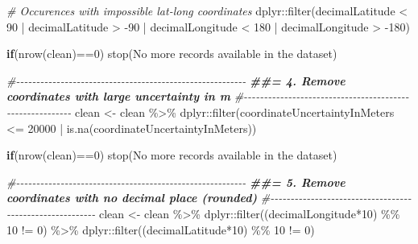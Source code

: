 \documentclass[
]{article}
\newenvironment{Shaded}{\begin{snugshade}}{\end{snugshade}}
\newcommand{\CommentTok}[1]{\textcolor[rgb]{0.56,0.35,0.01}{\textit{#1}}}
\newcommand{\ControlFlowTok}[1]{\textcolor[rgb]{0.13,0.29,0.53}{\textbf{#1}}}
\newcommand{\DecValTok}[1]{\textcolor[rgb]{0.00,0.00,0.81}{#1}}
\newcommand{\DocumentationTok}[1]{\textcolor[rgb]{0.56,0.35,0.01}{\textbf{\textit{#1}}}}
\newcommand{\FunctionTok}[1]{\textcolor[rgb]{0.00,0.00,0.00}{#1}}
\newcommand{\NormalTok}[1]{#1}
\newcommand{\OtherTok}[1]{\textcolor[rgb]{0.56,0.35,0.01}{#1}}
\newcommand{\SpecialCharTok}[1]{\textcolor[rgb]{0.00,0.00,0.00}{#1}}
\newcommand{\StringTok}[1]{\textcolor[rgb]{0.31,0.60,0.02}{#1}}
\begin{document}
\begin{Shaded}
\begin{Highlighting}[]
  \CommentTok{\# Occurences with impossible lat{-}long coordinates}
\NormalTok{  dplyr}\SpecialCharTok{::}\FunctionTok{filter}\NormalTok{(decimalLatitude }\SpecialCharTok{\textless{}} \DecValTok{90} \SpecialCharTok{|}\NormalTok{ decimalLatitude }\SpecialCharTok{\textgreater{}} \SpecialCharTok{{-}}\DecValTok{90} \SpecialCharTok{|}
\NormalTok{                  decimalLongitude }\SpecialCharTok{\textless{}} \DecValTok{180} \SpecialCharTok{|}\NormalTok{ decimalLongitude }\SpecialCharTok{\textgreater{}} \SpecialCharTok{{-}}\DecValTok{180}\NormalTok{)}

\ControlFlowTok{if}\NormalTok{(}\FunctionTok{nrow}\NormalTok{(clean)}\SpecialCharTok{==}\DecValTok{0}\NormalTok{) }\FunctionTok{stop}\NormalTok{(}\StringTok{\textquotesingle{}No more records available in the dataset\textquotesingle{}}\NormalTok{)}

\CommentTok{\#{-}{-}{-}{-}{-}{-}{-}{-}{-}{-}{-}{-}{-}{-}{-}{-}{-}{-}{-}{-}{-}{-}{-}{-}{-}{-}{-}{-}{-}{-}{-}{-}{-}{-}{-}{-}{-}{-}{-}{-}{-}{-}{-}{-}{-}{-}{-}{-}{-}{-}{-}{-}{-}{-}{-}{-}{-}}
\DocumentationTok{\#\#= 4. Remove coordinates with large uncertainty in m}
\CommentTok{\#{-}{-}{-}{-}{-}{-}{-}{-}{-}{-}{-}{-}{-}{-}{-}{-}{-}{-}{-}{-}{-}{-}{-}{-}{-}{-}{-}{-}{-}{-}{-}{-}{-}{-}{-}{-}{-}{-}{-}{-}{-}{-}{-}{-}{-}{-}{-}{-}{-}{-}{-}{-}{-}{-}{-}{-}{-}}
\NormalTok{clean }\OtherTok{\textless{}{-}}\NormalTok{ clean }\SpecialCharTok{\%\textgreater{}\%}
\NormalTok{  dplyr}\SpecialCharTok{::}\FunctionTok{filter}\NormalTok{(coordinateUncertaintyInMeters }\SpecialCharTok{\textless{}=} \DecValTok{20000} \SpecialCharTok{|}
                  \FunctionTok{is.na}\NormalTok{(coordinateUncertaintyInMeters))}

\ControlFlowTok{if}\NormalTok{(}\FunctionTok{nrow}\NormalTok{(clean)}\SpecialCharTok{==}\DecValTok{0}\NormalTok{) }\FunctionTok{stop}\NormalTok{(}\StringTok{\textquotesingle{}No more records available in the dataset\textquotesingle{}}\NormalTok{)}

\CommentTok{\#{-}{-}{-}{-}{-}{-}{-}{-}{-}{-}{-}{-}{-}{-}{-}{-}{-}{-}{-}{-}{-}{-}{-}{-}{-}{-}{-}{-}{-}{-}{-}{-}{-}{-}{-}{-}{-}{-}{-}{-}{-}{-}{-}{-}{-}{-}{-}{-}{-}{-}{-}{-}{-}{-}{-}{-}{-}}
\DocumentationTok{\#\#= 5. Remove coordinates with no decimal place (rounded)}
\CommentTok{\#{-}{-}{-}{-}{-}{-}{-}{-}{-}{-}{-}{-}{-}{-}{-}{-}{-}{-}{-}{-}{-}{-}{-}{-}{-}{-}{-}{-}{-}{-}{-}{-}{-}{-}{-}{-}{-}{-}{-}{-}{-}{-}{-}{-}{-}{-}{-}{-}{-}{-}{-}{-}{-}{-}{-}{-}{-}}
\NormalTok{clean }\OtherTok{\textless{}{-}}\NormalTok{ clean }\SpecialCharTok{\%\textgreater{}\%}
\NormalTok{  dplyr}\SpecialCharTok{::}\FunctionTok{filter}\NormalTok{((decimalLongitude}\SpecialCharTok{*}\DecValTok{10}\NormalTok{) }\SpecialCharTok{\%\%} \DecValTok{10} \SpecialCharTok{!=} \DecValTok{0}\NormalTok{) }\SpecialCharTok{\%\textgreater{}\%}
\NormalTok{  dplyr}\SpecialCharTok{::}\FunctionTok{filter}\NormalTok{((decimalLatitude}\SpecialCharTok{*}\DecValTok{10}\NormalTok{) }\SpecialCharTok{\%\%} \DecValTok{10} \SpecialCharTok{!=} \DecValTok{0}\NormalTok{)}


\end{Highlighting}
\end{Shaded}
\end{document}
